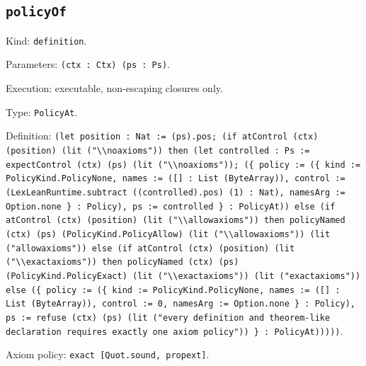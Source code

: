 \documentclass[11pt]{article}
\begin{document}
\subsection*{\texttt{policyOf}}
\noindent Kind: \texttt{definition}.\par
\noindent Parameters: \texttt{(ctx : Ctx) (ps : Ps)}.\par
\noindent Execution: executable, non-escaping closures only.\par
\noindent Type: \texttt{PolicyAt}.\par
\noindent Definition: \texttt{(let position : Nat := (ps).pos; (if atControl (ctx) (position) (lit ("\textbackslash{}\textbackslash{}noaxioms")) then (let controlled : Ps := expectControl (ctx) (ps) (lit ("\textbackslash{}\textbackslash{}noaxioms")); (\{ policy := (\{ kind := PolicyKind.PolicyNone, names := ([] : List (ByteArray)), control := (LexLeanRuntime.subtract ((controlled).pos) (1) : Nat), namesArg := Option.none \} : Policy), ps := controlled \} : PolicyAt)) else (if atControl (ctx) (position) (lit ("\textbackslash{}\textbackslash{}allowaxioms")) then policyNamed (ctx) (ps) (PolicyKind.PolicyAllow) (lit ("\textbackslash{}\textbackslash{}allowaxioms")) (lit ("allowaxioms")) else (if atControl (ctx) (position) (lit ("\textbackslash{}\textbackslash{}exactaxioms")) then policyNamed (ctx) (ps) (PolicyKind.PolicyExact) (lit ("\textbackslash{}\textbackslash{}exactaxioms")) (lit ("exactaxioms")) else (\{ policy := (\{ kind := PolicyKind.PolicyNone, names := ([] : List (ByteArray)), control := 0, namesArg := Option.none \} : Policy), ps := refuse (ctx) (ps) (lit ("every definition and theorem-like declaration requires exactly one axiom policy")) \} : PolicyAt)))))}.\par
\noindent Axiom policy: \texttt{exact [Quot.sound, propext]}.\par
\end{document}
